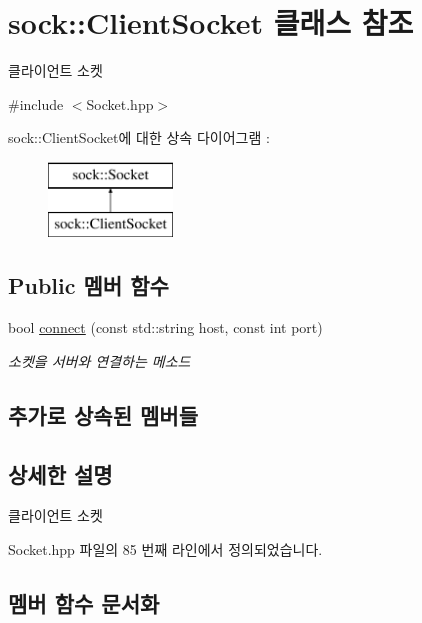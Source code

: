 \hypertarget{classsock_1_1_client_socket}{}\section{sock\+:\+:Client\+Socket 클래스 참조}
\label{classsock_1_1_client_socket}


클라이언트 소켓  




{\ttfamily \#include $<$Socket.\+hpp$>$}

sock\+:\+:Client\+Socket에 대한 상속 다이어그램 \+: \begin{figure}[H]
\begin{center}
\leavevmode
\includegraphics[height=2.000000cm]{classsock_1_1_client_socket}
\end{center}
\end{figure}
\subsection*{Public 멤버 함수}
\begin{DoxyCompactItemize}
\item 
bool \hyperlink{classsock_1_1_client_socket_af579d535f69a899beab546f668aa95bf}{connect} (const std\+::string host, const int port)
\begin{DoxyCompactList}\small\item\em 소켓을 서버와 연결하는 메소드 \end{DoxyCompactList}\end{DoxyCompactItemize}
\subsection*{추가로 상속된 멤버들}


\subsection{상세한 설명}
클라이언트 소켓 

Socket.\+hpp 파일의 85 번째 라인에서 정의되었습니다.



\subsection{멤버 함수 문서화}
\mbox{\label{classsock_1_1_client_socket_af579d535f69a899beab546f668aa95bf}} 
